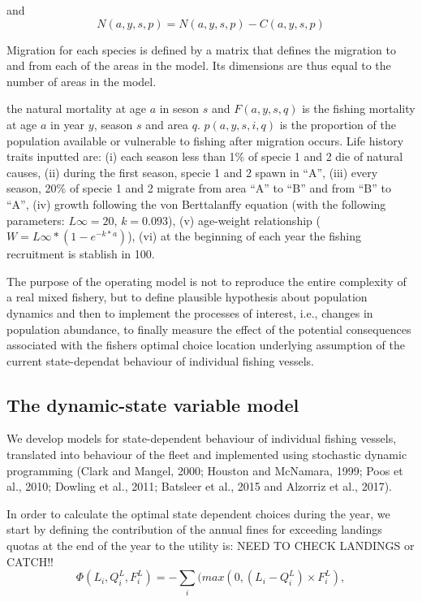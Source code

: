 \documentclass[12pt,oneline,a4paper,numbib]{ouparticle}
\begin{document}
and 
\begin{equation*}
N (a, y, s, p) = N (a, y, s, p) - C (a, y, s, p) 
\end{equation*}

Migration for each species is defined by a matrix that defines the migration to and from each of the areas in the model. Its dimensions are thus equal to the number of areas in the model.    


the natural mortality at age $a$ in seson $s$ and $F (a, y, s, q)$ is the fishing mortality at age $a$ in year $y$, season $s$ and area $q$. $p (a,y,s,i, q)$ is the proportion of the population available or vulnerable to fishing after migration occurs. Life history traits inputted are: (i) each season less than 1\% of specie 1 and 2 die of natural causes, (ii)  during the first season, specie 1 and 2 spawn in ``A'', (iii) every season, 20\% of specie 1 and 2 migrate from area ``A'' to ``B'' and from ``B'' to ``A'', (iv) growth following the von Berttalanffy equation (with the following parameters: $L\infty= 20$, $k= 0.093$), (v) age-weight relationship ($W= L\infty*(1-e^{-k*a})$), (vi) at the beginning of each year the fishing recruitment is stablish in 100.

The purpose of the operating model is not to reproduce the entire complexity of a real mixed fishery, but to define plausible hypothesis about population dynamics and then to implement the processes of interest, i.e., changes in population abundance, to finally measure the effect of the potential consequences associated with the fishers optimal choice location underlying assumption of the current state-dependat behaviour of individual fishing vessels.

\subsection{The dynamic-state variable model}
\label{sec2.2}

We develop models for state-dependent behaviour of individual fishing vessels, translated into behaviour of the fleet and implemented using stochastic dynamic programming (Clark and Mangel, 2000; Houston and McNamara, 1999; Poos et al., 2010; Dowling et al., 2011; Batsleer et al., 2015 and Alzorriz et al., 2017). 

In order to calculate the optimal state dependent choices during the year, we start by defining the contribution of the annual fines for exceeding landings quotas at the end of the year to the utility is: NEED TO CHECK LANDINGS or CATCH!!
\begin{equation*}
\Phi (L_i, Q_i^L, F_i^L) = -\sum_{i} (max(0, (L_i - Q_i^L)\times F_i^L),
\end{equation*}
\end{document}
